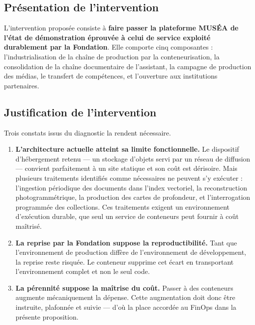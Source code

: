 \subsection{Présentation de l'intervention}

L'intervention proposée consiste à \textbf{faire passer la plateforme MUSÉA de
l'état de démonstration éprouvée à celui de service exploité durablement par la
Fondation}. Elle comporte cinq composantes : l'industrialisation de la chaîne de
production par la conteneurisation, la consolidation de la chaîne documentaire
de l'assistant, la campagne de production des médias, le transfert de
compétences, et l'ouverture aux institutions partenaires.

\subsection{Justification de l'intervention}

Trois constats issus du diagnostic la rendent nécessaire.

\begin{enumerate}
  \item \textbf{L'architecture actuelle atteint sa limite fonctionnelle.} Le
        dispositif d'hébergement retenu — un stockage d'objets servi par un
        réseau de diffusion — convient parfaitement à un site statique et son
        coût est dérisoire. Mais plusieurs traitements identifiés comme
        nécessaires ne peuvent s'y exécuter : l'ingestion périodique des
        documents dans l'index vectoriel, la reconstruction photogrammétrique,
        la production des cartes de profondeur, et l'interrogation programmée
        des collections. Ces traitements exigent un environnement d'exécution
        durable, que seul un service de conteneurs peut fournir à coût maîtrisé.

  \item \textbf{La reprise par la Fondation suppose la reproductibilité.} Tant
        que l'environnement de production diffère de l'environnement de
        développement, la reprise reste risquée. Le conteneur supprime cet écart
        en transportant l'environnement complet et non le seul code.

  \item \textbf{La pérennité suppose la maîtrise du coût.} Passer à des
        conteneurs augmente mécaniquement la dépense. Cette augmentation doit
        donc être instruite, plafonnée et suivie — d'où la place accordée au
        FinOps dans la présente proposition.
\end{enumerate}

